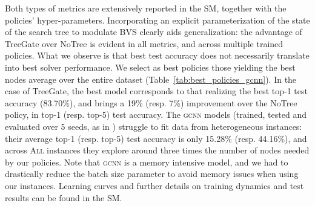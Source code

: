 \documentclass[letterpaper]{article} %
\begin{document}
Both types of metrics are extensively reported in the SM, together with the policies' hyper-parameters.
Incorporating an explicit parameterization of the state of the search tree to modulate BVS clearly aids generalization: the advantage of TreeGate over NoTree is evident in all metrics, and across multiple trained policies.
What we observe is that best test accuracy does not necessarily translate into best solver performance.
We select as best policies those yielding the best nodes average over the entire dataset (Table~\ref{tab:best_policies_gcnn}).
In the case of TreeGate, the best model corresponds to that realizing the best top-1 test accuracy (83.70\%), and brings a 19\% (resp. 7\%) improvement over the NoTree policy, in top-1 (resp. top-5) test accuracy.
The \textsc{gcnn} models (trained, tested and evaluated over 5 seeds, as in \citeauthor{NIPS2019_9690}) struggle to fit data from heterogeneous instances: their average top-1 (resp. top-5) test accuracy is only 15.28\% (resp. 44.16\%), and across \textsc{All} instances they explore around three times the number of nodes needed by our policies.
Note that \textsc{gcnn} is a memory intensive model, and we had to drastically reduce the batch size parameter to avoid memory issues when using our instances.
Learning curves and further details on training dynamics and test results can be found in the SM.
\end{document}

